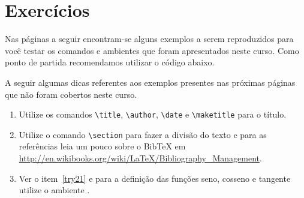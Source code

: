 % 
% 
% 
% 
% 
% 
%
%
\chapter{Exercícios}
Nas páginas a seguir encontram-se alguns exemplos a serem reproduzidos para você testar os comandos e ambientes que foram apresentados neste curso. Como ponto de partida recomendamos utilizar o código abaixo.

A seguir algumas dicas referentes aos exemplos presentes nas próximas páginas que não foram cobertos neste curso.
\begin{enumerate}
    \item \label{try11} Utilize os comandos \lstinline!\title!, \lstinline!\author!, \lstinline!\date! e \lstinline!\maketitle! para o título.
    \item \label{try21} Utilize o comando \lstinline!\section! para fazer a divisão do texto e para as referências leia um pouco sobre o BibTeX em \url{http://en.wikibooks.org/wiki/LaTeX/Bibliography_Management}.
    \item \label{try31} Ver o item~\ref{try21} e para a definição das funções seno, cosseno e tangente utilize o ambiente .
\end{enumerate}

